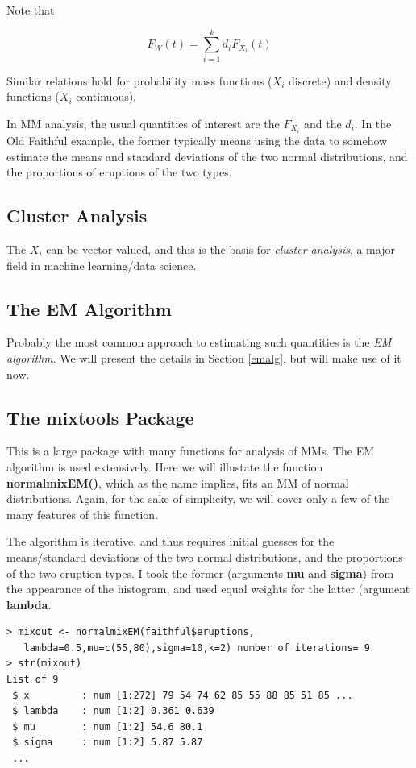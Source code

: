 \documentclass[11pt]{article}
\begin{document}
Note that

\begin{equation}
F_{W}(t) = \sum_{i=1}^k d_i F_{X_i}(t)
\end{equation}

Similar relations hold for probability mass functions ($X_i$ discrete)
and density functions ($X_i$ continuous).

In MM analysis, the usual quantities of interest are the 
$F_{X_i}$ and the $d_i$.  In the Old Faithful example, the former 
typically means using the data to somehow estimate the means and
standard deviations of the two normal distributions, and the proportions
of eruptions of the two types.

\subsection{Cluster Analysis}

The $X_i$ can be vector-valued, and this is the basis for
\textit{cluster analysis}, a major field in machine learning/data
science.

\subsection{The EM Algorithm}

Probably the most common approach to estimating such quantities is the
\textit{EM algorithm}.  We will present the details in Section
\ref{emalg}, but will make use of it now.

\subsection{The mixtools Package}

This is a large package with many functions for analysis of MMs.  The EM
algorithm is used extensively.  Here we will illustate the function
\textbf{normalmixEM()}, which as the name implies, fits an MM of normal
distributions.  Again, for the sake of simplicity, we will cover only a
few of the many features of this function.

The algorithm is iterative, and thus requires initial guesses for the
means/standard deviations of the two normal distributions, and the
proportions of the two eruption types.  I took the former (arguments
\textbf{mu} and \textbf{sigma}) from the appearance of the histogram,
and used equal weights for the latter (argument \textbf{lambda}.

\begin{lstlisting}
> mixout <- normalmixEM(faithful$eruptions,
   lambda=0.5,mu=c(55,80),sigma=10,k=2) number of iterations= 9 
> str(mixout)
List of 9
 $ x         : num [1:272] 79 54 74 62 85 55 88 85 51 85 ...
 $ lambda    : num [1:2] 0.361 0.639
 $ mu        : num [1:2] 54.6 80.1
 $ sigma     : num [1:2] 5.87 5.87
 ...
\end{lstlisting}
\end{document}
